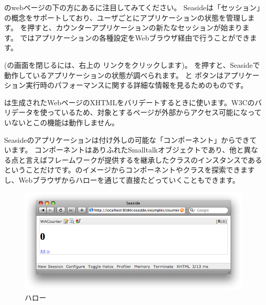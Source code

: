 \documentclass[a4paper,10pt,twoside]{book}
\begin{document}
のwebページの下の方にあるに注目してみてください。
Seasideは「セッション」の概念をサポートしており、ユーザごとにアプリケーションの状態を管理します。
 を押すと、カウンターアプリケーションの新たなセッションが始まります。
 ではアプリケーションの各種設定をWebブラウザ経由で行うことができます。

(の画面を閉じるには、右上の  リンクをクリックします)。
 を押すと、Seasideで動作しているアプリケーションの状態が調べられます。
 と  ボタンはアプリケーション実行時のパフォーマンスに関する詳細な情報を見るためのものです。

 は生成されたWebページのXHTMLをバリデートするときに使います。W3Cのバリデータを使っているため、対象とするページが外部からアクセス可能になっていないとこの機能は動作しません。

Seasideのアプリケーションは付け外しの可能な「コンポーネント」からできています。
コンポーネントはありふれたSmalltalkオブジェクトであり、他と異なる点と言えばフレームワークが提供するを継承したクラスのインスタンスであるということだけです。\pharo のイメージからコンポーネントやクラスを探索できますし、Webブラウザからハローを通じて直接たどっていくこともできます。

\begin{figure}[ht]
\begin{center}
\includegraphics[width=\textwidth]{counterHalos}
\caption{ハロー}
\end{center}
\end{figure}

\end{document}
